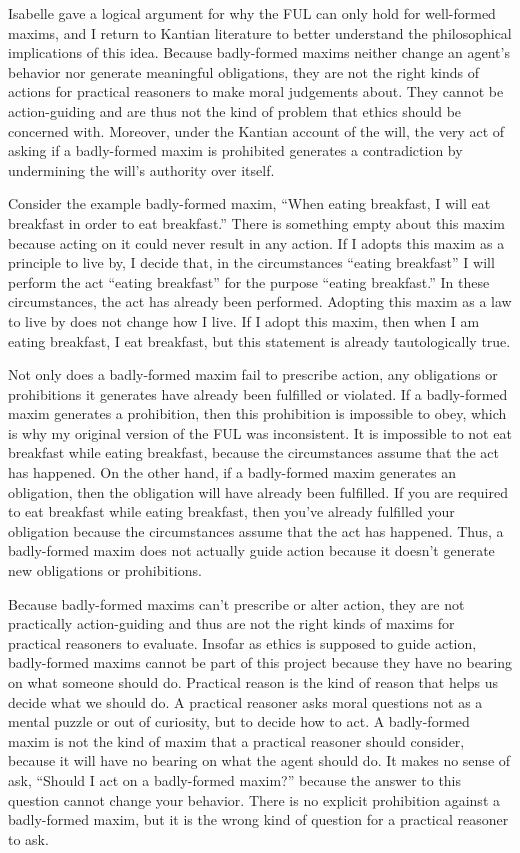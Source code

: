 \begin{isabellebody}
\begin{isamarkuptext}
Isabelle gave a logical argument for why the FUL can only hold for well-formed maxims, and I return to Kantian
literature to better understand the philosophical implications of this idea. Because badly-formed maxims
neither change an agent's behavior nor generate meaningful obligations, they are not the right kinds of 
actions for practical reasoners to make moral judgements about. They cannot be action-guiding and are thus not the kind of problem that 
ethics should be concerned with. Moreover, under the Kantian account of the will, the very act of asking 
if a badly-formed maxim is prohibited generates a contradiction by undermining the will's authority over itself. 

Consider the example badly-formed maxim, ``When eating breakfast, I will eat breakfast in order to 
eat breakfast.'' There is something empty about this maxim because acting on it could never result in 
any action. If I adopts this maxim as a principle to live by,
I decide that, in the circumstances ``eating breakfast'' I will perform the act ``eating breakfast''
for the purpose ``eating breakfast.'' In these circumstances, the act has 
already been performed. Adopting this maxim as a law to live by does not change how I live. If I adopt 
this maxim, then when I am eating breakfast, I eat breakfast, but this statement is already tautologically true. 

Not only does a badly-formed maxim fail to prescribe action, any obligations or prohibitions it 
generates have already been fulfilled or violated. If a badly-formed maxim generates a prohibition, 
then this prohibition is impossible to obey, which is why my original version of the FUL was inconsistent. 
It is impossible to not eat breakfast while eating breakfast, because the circumstances assume that the 
act has happened. On the other hand, if a badly-formed maxim generates an obligation, then the obligation 
will have already been fulfilled. If you are required to eat breakfast while eating breakfast, then you've 
already fulfilled your obligation because the circumstances assume that the act has happened. Thus, 
a badly-formed maxim does not actually guide action because it doesn't generate new obligations or 
prohibitions. 

Because badly-formed maxims can't prescribe or alter action, they are not practically action-guiding and 
thus are not the right kinds of maxims for practical reasoners to evaluate. Insofar as ethics 
is supposed to guide action, badly-formed maxims cannot be part of this project because they
have no bearing on what someone should do. Practical reason is the kind of reason that helps us decide 
what we should do. A practical reasoner asks moral questions not as a mental puzzle or out of curiosity, but 
to decide how to act. A badly-formed maxim is not the kind of maxim that a practical reasoner should consider, because it
will have no bearing on what the agent should do. It makes no sense of ask, ``Should I act on a badly-formed
maxim?'' because the answer to this question cannot change your behavior. There is no explicit prohibition 
against a badly-formed maxim, but it is the wrong kind of question for a practical reasoner to ask.


\end{isamarkuptext}
\end{isabellebody}

